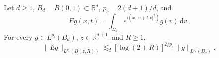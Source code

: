 Let $d\geq 1$, $B_d=B(0,1)\subset\mathbb R^d$, $p_c=2(d+1)/d$, and
\[
Eg(x,t)=\int_{B_d}e^{\mathrm i(x\cdot v+t|v|^2)}g(v)\,\mathrm dv.
\]
For every $g\in L^{p_c}(B_d)$, $z\in\mathbb R^{d+1}$, and $R\geq 1$,
\[
\|Eg\|_{L^{p_c}(B(z,R))}
 \lesssim_d[\log(2+R)]^{2/p_c}\|g\|_{L^{p_c}(B_d)}.
\]
